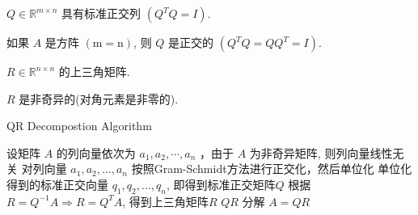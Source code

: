 \begin{corollary}
    $ Q \in \mathbb{R}^{m \times n} $ 具有标准正交列 $ \left(Q^{T} Q=I\right) $.
\end{corollary}

\begin{corollary}
    如果 $ A $ 是方阵 $ (\mathrm{m}=\mathrm{n}) $, 则 $ Q $ 是正交的 $ \left(Q^{T} Q=Q Q^{T}=I\right) $.
\end{corollary}

\begin{corollary}
    $ R \in \mathbb{R}^{n \times n} $ 的上三角矩阵.
\end{corollary}

\begin{corollary}
     $ R $ 是非奇异的(对角元素是非零的).
\end{corollary}

\begin{algorithm}[htbp]
    \caption{QR Decompostion Algorithm}
    
    设矩阵 $ A $ 的列向量依次为 $ a_{1}, a_{2}, \cdots, a_{n} $ ，由于 $ A $ 为非奇异矩阵, 则列向量线性无关\;
    对列向量 $ a_{1}, a_{2}, \ldots, a_{n} $ 按照Gram-Schmidt方法进行正交化，然后单位化\;
    单位化得到的标准正交向量 $ q_{1}, q_{2}, \ldots, q_{n} $, 即得到标准正交矩阵$Q$\;
    根据 $ R=Q^{-1} A \Rightarrow R=Q^{T} A $, 得到上三角矩阵$R$\;
    $ Q R $ 分解 $ A=Q R $\;
\end{algorithm}

